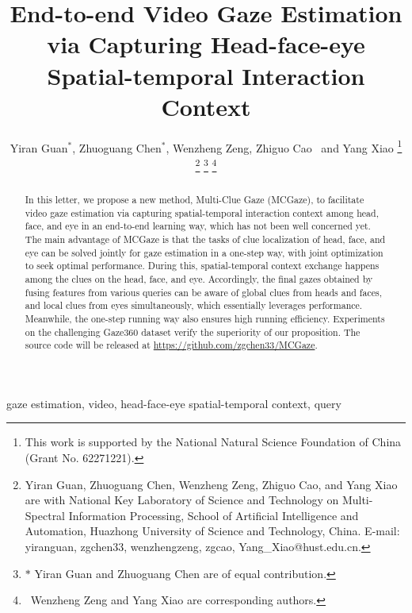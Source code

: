 \documentclass[journal]{IEEEtran}
\begin{document}
\title{End-to-end Video Gaze Estimation via Capturing Head-face-eye Spatial-temporal Interaction Context }

\author{Yiran Guan$^*$, Zhuoguang Chen$^*$, Wenzheng Zeng\dag, Zhiguo Cao~ and Yang Xiao\dag  
\thanks{This work is supported by the National Natural Science Foundation of China (Grant No. 62271221). }
\thanks{Yiran Guan, Zhuoguang Chen, Wenzheng Zeng, Zhiguo Cao, and Yang Xiao are with National Key Laboratory of Science and Technology on Multi-Spectral Information Processing, School of Artificial Intelligence and Automation, Huazhong University of Science and Technology, China. E-mail: yiranguan, zgchen33, wenzhengzeng, zgcao, Yang\_Xiao@hust.edu.cn. }
\thanks{$*$ Yiran Guan and Zhuoguang Chen are of equal contribution.}
\thanks{\dag~Wenzheng Zeng and Yang Xiao are corresponding authors.}
}


\maketitle
\begin{abstract}
 In this letter, we propose a new method, Multi-Clue Gaze (MCGaze), to facilitate video gaze estimation via capturing spatial-temporal interaction context among head, face, and eye in an end-to-end learning way, which has not been well concerned yet. The main advantage of MCGaze is that the tasks of clue localization of head, face, and eye can be solved jointly for gaze estimation in a one-step way, with joint optimization to seek optimal performance. During this, spatial-temporal context exchange happens among the clues on the head, face, and eye. Accordingly, the final gazes obtained by fusing features from various queries can be aware of global clues from heads and faces, and local clues from eyes simultaneously, which essentially leverages performance. Meanwhile, the one-step running way also ensures high running efficiency. Experiments on the challenging Gaze360 dataset verify the superiority of our proposition. The source code will be released at \url{https://github.com/zgchen33/MCGaze}.


\end{abstract}

\begin{IEEEkeywords}
gaze estimation, video, head-face-eye spatial-temporal context, query\end{IEEEkeywords}


\IEEEpeerreviewmaketitle
\end{document}
